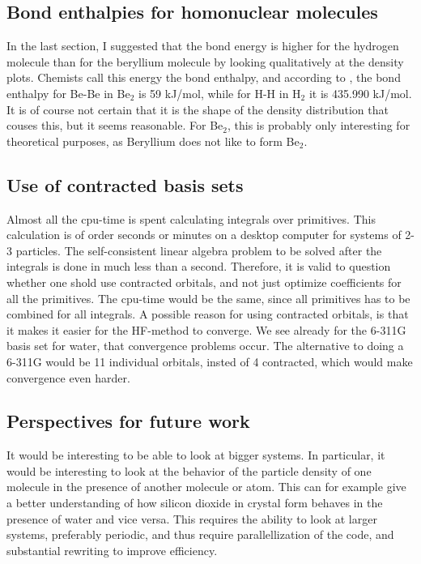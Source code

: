 \documentclass[a4paper,10pt, twocolumn, pre]{revtex4}
\begin{document}
\subsection{Bond enthalpies for homonuclear molecules}
In the last section, I suggested that the bond energy is higher for the hydrogen molecule than for the beryllium molecule by looking qualitatively at the density plots. Chemists call this energy the bond enthalpy, and according to \cite{lide2004crc}, the bond enthalpy for Be-Be in Be$_2$ is 59 kJ/mol, while for H-H in H$_2$ it is 435.990 kJ/mol. It is of course not certain that it is the shape of the density distribution that couses this, but it seems reasonable. For Be$_2$, this is probably only interesting for theoretical purposes, as Beryllium does not like to form Be$_2$.



\subsection{Use of contracted basis sets}
Almost all the cpu-time is spent calculating integrals over primitives. This calculation is of order seconds or minutes on a desktop computer for systems of 2-3 particles. The self-consistent linear algebra problem to be solved after the integrals is done in much less than a second. Therefore, it is valid to question whether one shold use contracted orbitals, and not just optimize coefficients for all the primitives. The cpu-time would be the same, since all primitives has to be combined for all integrals. A possible reason for using contracted orbitals, is that it makes it easier for the HF-method to converge. We see already for the 6-311G basis set for water, that convergence problems occur. The alternative to doing a 6-311G would be 11 individual orbitals, insted of 4 contracted, which would make convergence even harder. 


\subsection{Perspectives for future work}
It would be interesting to be able to look at bigger systems. In particular, it would be interesting to look at the behavior of the particle density of one molecule in the presence of another molecule or atom. This can for example give a better understanding of how silicon dioxide in crystal form behaves in the presence of water and vice versa. This requires the ability to look at larger systems, preferably periodic, and thus require parallellization of the code, and substantial rewriting to improve efficiency. 
\end{document}
